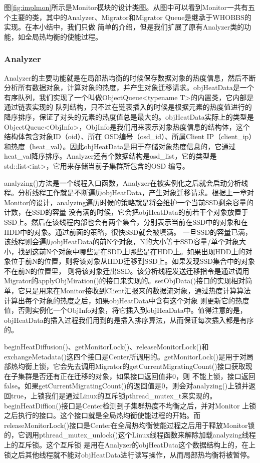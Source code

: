 图\ref{fig:implmon}所示是Monitor模块的设计类图。从图中可以看到Monitor一共有五个主要的类，其中的Analyzer、Migrator和Migrator Queue是继承于WHOBBS的实现\cite{lingxuan2015whobbs}。在本小结中，我们只做
简单的介绍，但是我们扩展了原有Analyzer类的功能，如全局热均衡的使能过程。

\subsubsection{Analyzer}
Analyzer的主要功能就是在局部热均衡的时候保存数据对象的热度信息，然后不断分析所有数据对象，计算对象的热度，并产生对象迁移请求。objHeatData是一个有序队列，我们实现了一个叫做ObjectQueue<typename T>的内置类，它内部是通过链表实现的
队列结构，只不过在链表插入的时候是根据元素的热度值进行的降序排序，保证了对头的元素的热度值总是最大的。objHeatData实际上的类型是ObjectQueue<ObjInfo>，ObjInfo是我们用来表示对象热度信息的结构体，这个结构体包含对象ID（oid）、所在
OSD编号（osd\_id）、所属Client IP（client\_ip）和热度（heat\_val）。因此objHeatData是用于存储对象热度信息的，它通过heat\_val降序排序。Analyzer还有个数据结构是osd\_list，它的类型是std::list<int>，它用来存储当前子集群所包含的OSD
编号。

analyzing()方法是一个线程入口函数，Analyzer在被实例化之后就会启动分析线程。分析线程工作就是不断遍历objHeatData，产生对象迁移请求。根据上一章对Monitor的设计，analyzing遍历时候的策略就是将会维护一个当前SSD剩余容量的计数，在SSD的容量
没有满的时候，它会把objHeatData的前若干个对象放置于SSD上。然后在该线程内部也会有两个集合，分别表示当前在SSD中的对象和在HDD中的对象。通过前面的策略，很快SSD就会被填满。
一旦SSD的容量已满，该线程则会遍历objHeatData的前N个对象，N的大小等于SSD容量/单个对象大小，找到这前N个对象中哪些是在SDD上哪些是在HDD上。如果出现HDD上的对象位于前N的位置，则将该对象从HDD迁移到SSD上。如果发现SSD集合中的对象不在前N的位置里，
则将该对象迁出SSD\cite{lingxuan2015whobbs}。该分析线程发送迁移指令是通过调用Migrator的applyObjMiration()的接口来实现的。setObjData()接口的实现相对简单，它只是用来在Monitor接收到Client汇报来的数据流对象，通过热度计算算法计算出每个对象的热度之后，如果objHeatData中含有这个对象
则更新它的热度值，否则实例化一个ObjInfo对象，将它插入到objHeaData中。值得注意的是，objHeatData的插入过程我们用到的是插入排序算法，从而保证每次插入都是有序的。

beginHeatDiffusion()、getMonitorLock()、releaseMonitorLock()和exchangeMetadata()这四个接口是Center所调用的。getMonitorLock()是用于对局部热均衡上锁，它会先去调用Migrator的getCurrentMigratingCount()接口获取现在子集群是否还有正在迁移的对象，如果接口返回值非0，则
不能上锁，接口返回false。如果getCurrentMigratingCount()的返回值是0，则会对analyzing()上锁并返回true，上锁我们是通过Linux的互斥锁pthread\_mutex\_t来实现的。beginHeatDiffion()接口是Center检测到子集群热度不均衡之后，并对Monitor
上锁之后执行的接口。这个接口就是全局热均衡使能过程的开始。而releaseMonitorLock()接口是Center在全局热均衡使能过程之后用于释放Monitor锁的，它调用pthread\_mutex\_unlock()这个Linux线程函数来解除加载analyzing线程上的互斥锁。这个互斥锁
是用在Analyzer的objHeatData这个数据结构上的，在上锁之后其他线程就不能对objHeatData进行读写操作，从而局部热均衡将被暂停。

